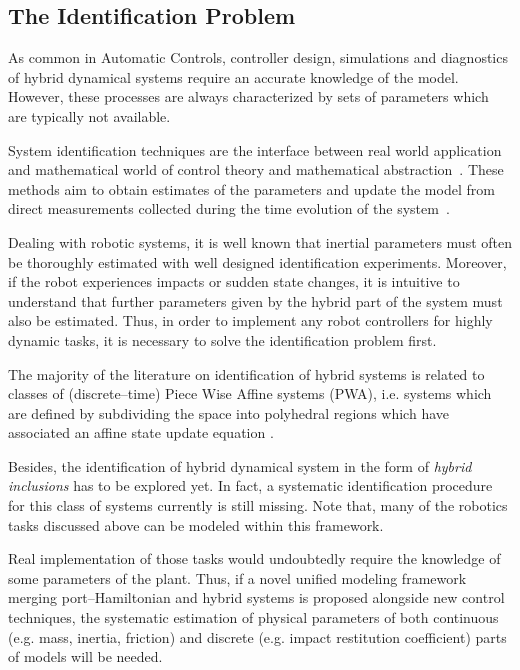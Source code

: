 \subsection{The Identification Problem}
%
As common in Automatic Controls, controller design, simulations and diagnostics of hybrid dynamical systems require an accurate knowledge of the model. However, these {processes} are always characterized by sets of parameters which are typically not available.
%
\newline

%
System identification techniques are the interface between real world application and mathematical world of control theory and mathematical abstraction~\citep{LJUNG20101}. These methods aim to obtain estimates of the parameters and update the model from direct measurements collected during the time evolution of the system~\citep{soderstrom2018errors,SODERSTROM2019}.
%
\newline

%
Dealing with robotic systems, it is well known that inertial parameters must often be thoroughly estimated with well designed identification experiments. Moreover, if the robot experiences impacts or sudden state changes, it is intuitive to understand that further parameters given by the hybrid part of the system must also be estimated. 
Thus, in order to implement any robot controllers for highly dynamic tasks, it is necessary to solve the identification problem first.
%
\newline

%
The majority of the literature on identification of hybrid systems is related to classes of (discrete--time) Piece Wise Affine systems (PWA), i.e. systems which are defined by subdividing the  space into polyhedral regions which have associated an affine state update equation \citep{Bemporad,Ferrari,Juloski,juloski2005bayesian Paoletti}.
% 
\newline

%
Besides, the identification of hybrid dynamical system in the form of \textit{hybrid inclusions} has to be explored yet. In fact, a systematic identification procedure for this class of systems currently is still missing. Note that, many of the robotics tasks discussed above can be modeled within this framework.
%
\newline

%
Real implementation of those tasks would undoubtedly require the knowledge of some parameters of the plant. Thus, if a novel unified modeling framework merging port--Hamiltonian and hybrid systems is proposed alongside new control techniques, the systematic estimation of physical parameters of both continuous (e.g. mass, inertia, friction) and discrete (e.g. impact restitution coefficient) parts of models  will be needed.
%
\clearpage


